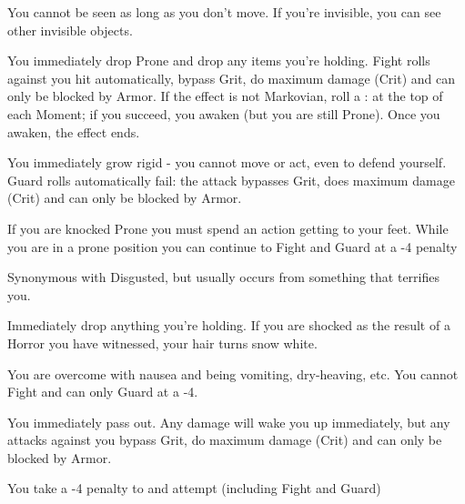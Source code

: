 {  

  You cannot be seen as long as you don't move.  If you're invisible, you can see other invisible objects.


  You immediately drop Prone and drop any items you're holding.  Fight rolls against you hit automatically, bypass Grit, do maximum damage (Crit) and can only be blocked by Armor.  If the effect is not Markovian, roll a \RS : \VIG at the top of each Moment; if you succeed, you awaken (but you are still Prone).  Once you awaken, the effect ends.


  You immediately grow rigid - you cannot move or act, even to defend yourself.  Guard rolls automatically fail: the attack bypasses Grit, does maximum damage (Crit) and can only be blocked by Armor.  


  If you are knocked Prone you must spend an action getting to your feet.  While you are in a prone position you can continue to Fight and Guard at a -4 penalty


  Synonymous with Disgusted, but usually occurs from something that terrifies you.


  Immediately drop anything you're holding.  If you are shocked as the result of a Horror you have witnessed, your hair turns snow white.


  You are overcome with nausea and being vomiting, dry-heaving, etc.  You cannot Fight and can only Guard at a -4.


  You immediately pass out.  Any damage will wake you up immediately, but any attacks against you bypass Grit, do maximum damage (Crit) and can only be blocked by Armor.


  You take a -4 penalty to  \RO  and \RB  attempt (including Fight and Guard)



}
